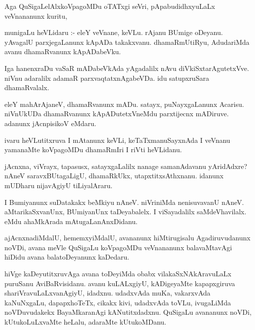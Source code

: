 \documentclass{article}
\begin{document}
\begin{mn}
Aga QuSigaLelAlxkoVpagoMDu oTATxgi seVri, pApabudidhxyuLaLx veVnananunx kuritu, 
\end{mn}

\begin{mn}
munigaLu heVLidaru :- eleY veVnane, keVLu. rAjanu BUmige oDeyanu. yAvagalU 
parxjegaLanunx kApADa takakxvanu. dhamaRmUtiRyu, AdudariMda avanu dhamaRvanunx kApADabeVku.
\end{mn}

\begin{mn}
Iga hanenxraDu vaSaR mADabeVkAda yAgadalilx nAvu diVkiSxtarAgutetxVve.  
niVnu adaralilx adamaR parxvaqtatxnAgabeVDa.  idu satupxruSara dhamaRvalalx.
\end{mn}

\begin{mn}
eleY mahArAjaneV, dhamaRvanunx mADu.  satayx, puNayxgaLanunx Acarisu. 
niVnUkUDa dhamaRvanunx kApADutetxVneMdu parxtijecnx mADiruve. adanunx jAcnpisikoV eMdaru. 
\end{mn}

\begin{mn}
ivaru heVLutitxruva I mAtanunx keVLi, keTaTxmanuSayxnAda I veVnanu yamanaMte 
koVpagoMDu dhamaRmIri I riVti heVLidanu.
\end{mn}

\begin{mn}
jAcnxna, viVrayx, tapasusx, satayxgaLalilx nanage samanAdavanu yAridAdxre? nAneV 
saravxBUtagaLigU, dhamaRkUkx, utapxtitxsAthxnanu. idanunx mUDharu nijavAgiyU tiLiyalAraru.
\end{mn}


\begin{mn}
I Bumiyanunx suDatakakx beMkiyu nAneV. niVriniMda nenisuvavanU nAneV.  
aMtarikaSxvanUnx, BUmiyanUnx taDeyabalelx. I viSayadalilx saMdeVhavilalx. 
eMdu ahaMkArada mAtugaLanAnxDidanu.
\end{mn}

\begin{mn}
ajAcnxnadiMdalU, hememxyiMdalU, avananunx hiMtirugisalu Agadiruvudanunx 
noVDi, avana meVle QuSigaLu koVpagoMDu veVnananunx balavaMtavAgi hiDidu 
avana balatoDeyanunx kaDedaru.
\end{mn}

\begin{mn}
hiVge kaDeyutitxruvAga avana toDeyiMda obabx vilakaSxNAkAravuLaLx puruSanu 
AviBaRvisidanu. avanu kuLALxgiyU, kADigeyaMte kapapxgiruva shariVravuLaLxvanAgiyU, 
idadxnu.  udadxvAda muKa, vakarxvAda kaNuNxgaLu, dapapxhoTeTx, cikakx kivi, 
udadxvAda toVLu, ivugaLiMda noVDuvudakekx BayaMkaranAgi kANutitxdadxnu. 
QuSigaLu avananunx noVDi, kUtukoLuLxvaMte heLalu, adaraMte kUtukoMDanu.
\end{mn}
\end{document}
